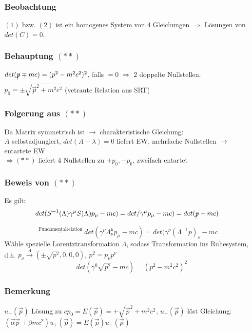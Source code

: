 \documentclass[twoside,a4paper]{scrartcl}
\renewcommand{\1}{\mathds{1}}
\newcommand{\Ra}{\Rightarrow}
\newcommand{\ra}{\rightarrow}
\renewcommand{\l}{\lambda}
\renewcommand{\L}{\Lambda}
\begin{document}
\subsubsection*{Beobachtung}
$(1)$ bzw. $(2)$ ist ein homogenes System von 4 Gleichungen $\Ra$ Lösungen von $det(C)=0$.
\subsubsection*{Behauptung $(**)$}
$det(\xout{p} \mp mc)=(p^2- m^2c^2)^2$, falls $=0$ $\Ra$ 2 doppelte Nullstellen.\\
$p_0=\pm\sqrt{\vec p^2+m^2c^2}$ (vetraute Relation aus SRT)
\subsubsection*{Folgerung aus $(**)$}
Da Matrix symmetrisch ist $\ra$ charakteristische Gleichung:\\
$A$ selbstadjungiert, $det(A-\l)=0$ liefert EW, mehrfache Nullstellen $\ra$ entartete EW\\
$\Ra (**)$ liefert 4 Nullstellen zu $+p_0,-p_0$, zweifach entartet
\subsubsection*{Beweis von $(**)$}
Es gilt:
$$det(S^{-1}(\L)\gamma^\mu S(\L) p_\mu-mc)=det/\gamma^\mu p_\mu -mc)=det(\xout{p} -mc)$$
$$\stackrel{\mathrm{Fundamentalrelation}}{=} det(\gamma^\nu \L_\nu^\mu p_\mu-mc)=det(\gamma^\nu(\L^{-1}p)_\nu-mc$$
Wähle spezielle Lorentztransformation $\L$, sodass Transformation ins Ruhesystem, d.h. $p_\nu \stackrel{\L}{\ra} (\pm \sqrt{p^2},0,0,0)$, $p^2=p_\nu p^\nu$
$$=det(\gamma^0\sqrt{p^2}-mc)=(p^2-m^2c^2)^2$$
\subsubsection*{Bemerkung}
$u_+(\vec p)$ Lösung zu $cp_0=E(\vec p)=+\sqrt{\vec p^2+m^2c^2}$, $u_+(\vec p)$ löst Gleichung: $(\vec \alpha \vec p+\beta mc^2)u_+(\vec p)=E(\vec p)u_+(\vec p)$
\end{document}
